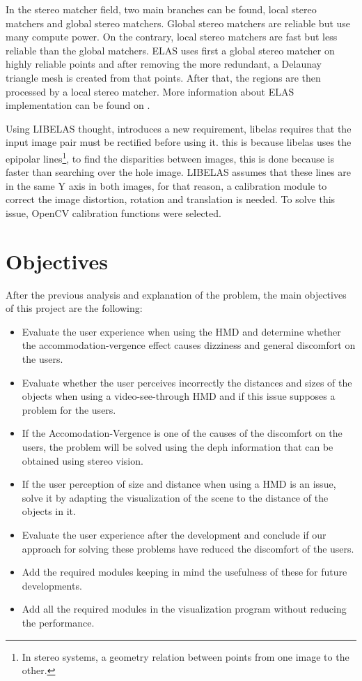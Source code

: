 \documentclass[10pt,a4paper,twocolumn,twoside]{article}
\begin{document}
	In the stereo matcher field, two main branches can be found, local stereo matchers and global stereo matchers. Global stereo matchers are reliable but use many compute power. On the contrary, local stereo matchers are fast but less reliable than the global matchers. ELAS uses first a global stereo matcher on highly reliable points and after removing the more redundant, a Delaunay triangle mesh is created from that points. After that, the regions are then processed by a local stereo matcher. More information about ELAS implementation can be found on \cite{LIBELAS}. 
	
	Using LIBELAS thought, introduces a new requirement, libelas requires that the input image pair must be rectified before using it. this is because libelas uses the epipolar lines\footnote{In stereo systems, a geometry relation between points from one image to the other. }, to find the disparities between images, this is done because is faster than searching over the hole image. LIBELAS assumes that these lines are in the same Y axis in both images, for that reason, a calibration module to correct the image distortion, rotation and translation is needed. To solve this issue, OpenCV calibration functions were selected.

	\section{Objectives}
	After the previous analysis and explanation of the problem, the main objectives of this project are the following: 

	\begin{itemize}
		\item Evaluate the user experience when using the HMD and determine whether the accommodation-vergence effect causes dizziness and general discomfort on the users. 
		
		\item Evaluate whether the user perceives incorrectly the distances and sizes of the objects when using a video-see-through HMD and if this issue supposes a problem for the users.
		
		\item If the Accomodation-Vergence is one of the causes of the discomfort on the users, the problem will be solved using the deph information that can be obtained using stereo vision. 
		
		\item If the user perception of size and distance when using a HMD is an issue, solve it by adapting the visualization of the scene to the distance of the objects in it.
		
		\item Evaluate the user experience after the development and conclude if our approach for solving these problems have reduced the discomfort of the users. 
		
		\item Add the required modules keeping in mind the usefulness of these for future developments.
		
		\item Add all the required modules in the visualization program without reducing the performance. 
	\end{itemize}
\end{document}
